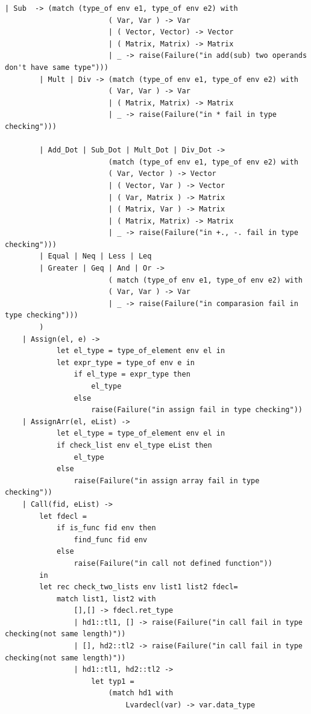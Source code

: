 \documentclass[12pt]{article} %
\begin{document}
\begin{lstlisting}[style=appendix, caption=check.ml]
        | Sub  -> (match (type_of env e1, type_of env e2) with
                        ( Var, Var ) -> Var
                        | ( Vector, Vector) -> Vector
                        | ( Matrix, Matrix) -> Matrix 
                        | _ -> raise(Failure("in add(sub) two operands don't have same type")))
        | Mult | Div -> (match (type_of env e1, type_of env e2) with
                        ( Var, Var ) -> Var
                        | ( Matrix, Matrix) -> Matrix
                        | _ -> raise(Failure("in * fail in type checking")))
               
        | Add_Dot | Sub_Dot | Mult_Dot | Div_Dot ->
                        (match (type_of env e1, type_of env e2) with
                        ( Var, Vector ) -> Vector
                        | ( Vector, Var ) -> Vector
                        | ( Var, Matrix ) -> Matrix
                        | ( Matrix, Var ) -> Matrix
                        | ( Matrix, Matrix) -> Matrix
                        | _ -> raise(Failure("in +., -. fail in type checking")))
        | Equal | Neq | Less | Leq
        | Greater | Geq | And | Or -> 
                        ( match (type_of env e1, type_of env e2) with
                        ( Var, Var ) -> Var
                        | _ -> raise(Failure("in comparasion fail in type checking")))
        )
    | Assign(el, e) ->
            let el_type = type_of_element env el in
            let expr_type = type_of env e in
                if el_type = expr_type then
                    el_type
                else
                    raise(Failure("in assign fail in type checking"))
    | AssignArr(el, eList) ->
            let el_type = type_of_element env el in
            if check_list env el_type eList then
                el_type
            else
                raise(Failure("in assign array fail in type checking"))
    | Call(fid, eList) -> 
        let fdecl = 
            if is_func fid env then
                find_func fid env
            else 
                raise(Failure("in call not defined function"))
        in
        let rec check_two_lists env list1 list2 fdecl= 
            match list1, list2 with
                [],[] -> fdecl.ret_type
                | hd1::tl1, [] -> raise(Failure("in call fail in type checking(not same length)"))
                | [], hd2::tl2 -> raise(Failure("in call fail in type checking(not same length)")) 
                | hd1::tl1, hd2::tl2 -> 
                    let typ1 = 
                        (match hd1 with
                            Lvardecl(var) -> var.data_type

\end{lstlisting}
\end{document}
